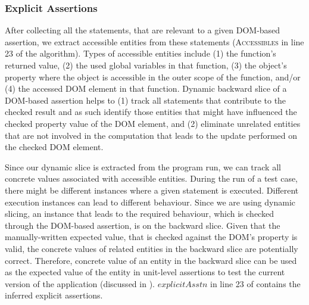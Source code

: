 \subsubsection{Explicit Assertions} \label{Sec:explicitAssertions}
After collecting all the statements, that are relevant to a given DOM-based assertion, we extract accessible entities from these statements (\textsc{Accessibles} in line 23 of the algorithm).
Types of accessible entities include (1) the function's returned value, (2) the used global variables in that function, (3) the object's property where the object is accessible in the outer scope of the function, and/or (4) the accessed DOM element in that function. Dynamic backward slice of a DOM-based assertion helps to (1) track all statements that contribute to the checked result and as such identify those entities that might have influenced the checked property value of the DOM element, and (2) eliminate unrelated entities that are not involved in the computation that leads to the update performed on the checked DOM element.

Since our dynamic slice is extracted from the program run, we can track all concrete values associated with accessible entities.
During the run of a test case, there might be different instances where a given statement is executed. Different execution instances can lead to different behaviour. Since we are using dynamic slicing, an instance that leads to the required behaviour, which is checked through the DOM-based assertion, is on the backward slice. Given that the manually-written expected value, that is checked against the DOM's property is valid, the concrete values of related entities in the backward slice are potentially correct. Therefore, concrete value of an entity in the backward slice can be used as the expected value of the entity in unit-level assertions to test the current version of the application (discussed in ).
$explicitAsstn$ in line 23 of  contains the inferred explicit assertions.

